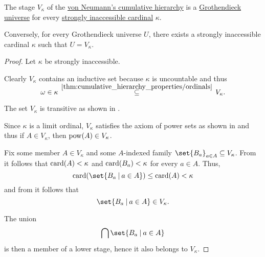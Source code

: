 \begin{theorem}\label{thm:grothendieck_universe_iff_strongly_inaccessible}
  The stage \( V_\kappa \) of the \hyperref[def:cumulative_hierarchy]{von Neumann's cumulative hierarchy} is a \hyperref[def:grothendieck_universe]{Grothendieck universe} for every \hyperref[def:regular_cardinal]{strongly inaccessible cardinal} \( \kappa \).

  Conversely, for every Grothendieck universe \( U \), there exists a strongly inaccessible cardinal \( \kappa \) such that \( U = V_\kappa \).
\end{theorem}
\begin{proof}
  \SufficiencySubProof Let \( \kappa \) be strongly inaccessible.

   Clearly \( V_\kappa \) contains an inductive set because \( \kappa \) is uncountable and thus
  \begin{equation*}
    \omega
    \in
    \kappa
    \reloset {\ref{thm:cumulative_hierarchy_properties/ordinals}} \subseteq
    V_\kappa.
  \end{equation*}

   The set \( V_\kappa \) is transitive as shown in .

   Since \( \kappa \) is a limit ordinal, \( V_\kappa \) satisfies the axiom of power sets as shown in  and thus if \( A \in V_\kappa \), then \( \operatorname{pow}(A) \in V_\kappa \).

   Fix some member \( A \in V_\kappa \) and some \( A \)-indexed family \( \set{ B_a }_{a \in A} \subseteq V_\kappa \). From  it follows that \( \operatorname{card}(A) < \kappa \) and \( \operatorname{card}(B_a) < \kappa \) for every \( a \in A \). Thus,
  \begin{equation*}
    \card(\set{ B_a \given a \in A }) \leq \card(A) < \kappa
  \end{equation*}
  and from  it follows that
  \begin{equation*}
    \set{ B_a \given a \in A } \in V_\kappa.
  \end{equation*}

  The union
  \begin{equation*}
    \bigcap \set{ B_a \given a \in A }
  \end{equation*}
  is then a member of a lower stage, hence it also belongs to \( V_\kappa \).


\end{proof}
